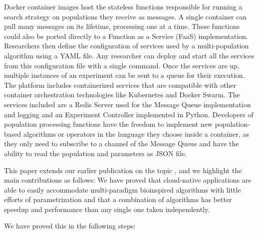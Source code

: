 \documentclass[review]{elsarticle}
\begin{document}
Docker container images host the stateless functions responsible for 
running a search strategy on populations they receive as messages. 
A single container can pull many messages on its lifetime, processing one at a time. 
These functions could also be ported
directly to a Function as a Service (FaaS) \cite{Roberts2016} implementation.
Researchers then define the configuration of services used by
a multi-population algorithm using a YAML file. Any researcher can deploy and
start all the services from this configuration file with a single command. Once
the services are up, multiple instances of an experiment can be sent to a queue
for their execution. The platform includes containerized services that are
compatible with other container orchestration technologies like Kubernetes and
Docker Swarm. The services included are a Redis Server used for the Message
Queue implementation and logging and an Experiment Controller implemented in
Python. Developers of population processing functions have the freedom to
implement new population-based algorithms or operators in the language they
choose inside a container, as they only need to subscribe to a channel of the
Message Queue and have the ability to read the population and parameters as JSON  
file.

This paper extends our earlier publication on the topic
\cite{guervos2018introducing}, and we highlight the main contributions as
follows:
We have proved that cloud-native applications are
able to easily accommodate multi-paradigm bioinspired algorithms
with little efforts of parametrization and
that a combination of algorithms has better speedup and performance
than any single one taken independently.

We have proved this in the following steps:
\end{document}
